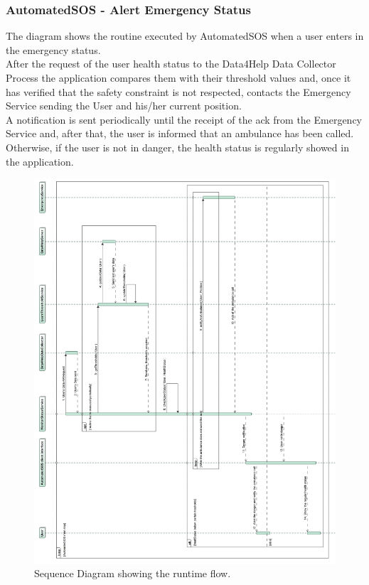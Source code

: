 \documentclass[a4paper]{article}
\begin{document}
\subsubsection{AutomatedSOS - Alert Emergency Status}
The diagram shows the routine executed by AutomatedSOS when a user enters in the emergency status. \\
After the request of the user health status to the Data4Help Data Collector Process the application compares them with their threshold values and, once it has verified that the safety constraint is not respected, contacts the Emergency Service sending the User and his/her current position. \\
A notification is sent periodically until the receipt of the ack from the Emergency Service and, after that, the user is informed that an ambulance has been called.\\
Otherwise, if the user is not in danger, the health status is regularly showed in the application.

\begin{figure}[H]
    \centering
    \includegraphics[width=\linewidth]{SequenceDiagram-AlertEmergencyStatus}
    \caption{Sequence Diagram showing the runtime flow.}
    \label{fig:my_label}
\end{figure}
\clearpage
\end{document}
